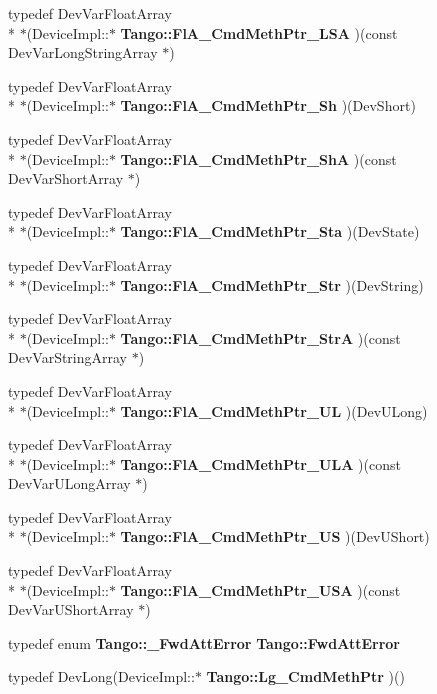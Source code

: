 \begin{DoxyCompactItemize}
\item 
typedef Dev\-Var\-Float\-Array \\*
$\ast$(Device\-Impl\-::$\ast$ {\bf Tango\-::\-Fl\-A\-\_\-\-Cmd\-Meth\-Ptr\-\_\-\-L\-S\-A} )(const Dev\-Var\-Long\-String\-Array $\ast$)
\item 
typedef Dev\-Var\-Float\-Array \\*
$\ast$(Device\-Impl\-::$\ast$ {\bf Tango\-::\-Fl\-A\-\_\-\-Cmd\-Meth\-Ptr\-\_\-\-Sh} )(Dev\-Short)
\item 
typedef Dev\-Var\-Float\-Array \\*
$\ast$(Device\-Impl\-::$\ast$ {\bf Tango\-::\-Fl\-A\-\_\-\-Cmd\-Meth\-Ptr\-\_\-\-Sh\-A} )(const Dev\-Var\-Short\-Array $\ast$)
\item 
typedef Dev\-Var\-Float\-Array \\*
$\ast$(Device\-Impl\-::$\ast$ {\bf Tango\-::\-Fl\-A\-\_\-\-Cmd\-Meth\-Ptr\-\_\-\-Sta} )(Dev\-State)
\item 
typedef Dev\-Var\-Float\-Array \\*
$\ast$(Device\-Impl\-::$\ast$ {\bf Tango\-::\-Fl\-A\-\_\-\-Cmd\-Meth\-Ptr\-\_\-\-Str} )(Dev\-String)
\item 
typedef Dev\-Var\-Float\-Array \\*
$\ast$(Device\-Impl\-::$\ast$ {\bf Tango\-::\-Fl\-A\-\_\-\-Cmd\-Meth\-Ptr\-\_\-\-Str\-A} )(const Dev\-Var\-String\-Array $\ast$)
\item 
typedef Dev\-Var\-Float\-Array \\*
$\ast$(Device\-Impl\-::$\ast$ {\bf Tango\-::\-Fl\-A\-\_\-\-Cmd\-Meth\-Ptr\-\_\-\-U\-L} )(Dev\-U\-Long)
\item 
typedef Dev\-Var\-Float\-Array \\*
$\ast$(Device\-Impl\-::$\ast$ {\bf Tango\-::\-Fl\-A\-\_\-\-Cmd\-Meth\-Ptr\-\_\-\-U\-L\-A} )(const Dev\-Var\-U\-Long\-Array $\ast$)
\item 
typedef Dev\-Var\-Float\-Array \\*
$\ast$(Device\-Impl\-::$\ast$ {\bf Tango\-::\-Fl\-A\-\_\-\-Cmd\-Meth\-Ptr\-\_\-\-U\-S} )(Dev\-U\-Short)
\item 
typedef Dev\-Var\-Float\-Array \\*
$\ast$(Device\-Impl\-::$\ast$ {\bf Tango\-::\-Fl\-A\-\_\-\-Cmd\-Meth\-Ptr\-\_\-\-U\-S\-A} )(const Dev\-Var\-U\-Short\-Array $\ast$)
\item 
typedef enum {\bf Tango\-::\-\_\-\-Fwd\-Att\-Error} {\bf Tango\-::\-Fwd\-Att\-Error}
\item 
typedef Dev\-Long(Device\-Impl\-::$\ast$ {\bf Tango\-::\-Lg\-\_\-\-Cmd\-Meth\-Ptr} )()

\end{DoxyCompactItemize}

